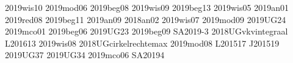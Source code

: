 2019wis10
2019mod06
2019beg08
2019wis09
2019beg13
2019wis05
2019an01
2019red08
2019beg11
2019an09
2018an02
2019wis07
2019mod09
2019UG24
2019mco01
2019beg06
2019UG23
2019beg09
SA2019-3
2018UGvkvintegraal
L201613
2019wis08
2018UGcirkelrechtemax
2019mod08
L201517
J201519
2019UG37
2019UG34
2019mco06
SA20194
